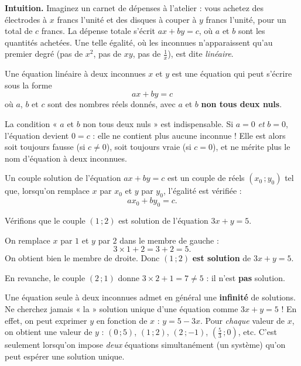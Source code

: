\documentclass[11pt]{article}
\newcommand{\cle}[1]{{\popxbold\color{popdark}#1}}
\newcounter{popsec}
\newcounter{popsub}
\newcommand{\courssub}[1]{%
  \stepcounter{popsub}%
  \par\vspace{9pt}\noindent{\popxbold\fontsize{11.5}{13}\selectfont\color{popink}{\color{poporange}\thepopsec.\thepopsub}\hspace{6pt}#1}\par\nopagebreak\vspace{4pt}
}
\begin{document}
\courssub{Équation linéaire à deux inconnues}

\textbf{Intuition.} Imaginez un carnet de dépenses à l'atelier : vous achetez des électrodes à $x$ francs l'unité et des disques à couper à $y$ francs l'unité, pour un total de $c$ francs. La dépense totale s'écrit $ax + by = c$, où $a$ et $b$ sont les quantités achetées. Une telle égalité, où les inconnues n'apparaissent qu'au premier degré (pas de $x^2$, pas de $xy$, pas de $\frac{1}{x}$), est dite \emph{linéaire}.

\begin{definition}
Une \cle{équation linéaire à deux inconnues} $x$ et $y$ est une équation qui peut s'écrire sous la forme
\[ ax + by = c \]
où $a$, $b$ et $c$ sont des nombres réels donnés, avec $a$ et $b$ \textbf{non tous deux nuls}.
\end{definition}

\begin{attention}
La condition « $a$ et $b$ non tous deux nuls » est indispensable. Si $a = 0$ \emph{et} $b = 0$, l'équation devient $0 = c$ : elle ne contient plus aucune inconnue ! Elle est alors soit toujours fausse (si $c \neq 0$), soit toujours vraie (si $c = 0$), et ne mérite plus le nom d'équation à deux inconnues.
\end{attention}

\begin{definition}
Un \cle{couple solution} de l'équation $ax + by = c$ est un couple de réels $(x_0 \,; y_0)$ tel que, lorsqu'on remplace $x$ par $x_0$ et $y$ par $y_0$, l'égalité est vérifiée :
\[ a x_0 + b y_0 = c. \]
\end{definition}

\begin{exemplebox}
Vérifions que le couple $(1 \,; 2)$ est solution de l'équation $3x + y = 5$.

On remplace $x$ par $1$ et $y$ par $2$ dans le membre de gauche :
\[ 3 \times 1 + 2 = 3 + 2 = 5. \]
On obtient bien le membre de droite. Donc $(1 \,; 2)$ \textbf{est solution} de $3x + y = 5$.

En revanche, le couple $(2 \,; 1)$ donne $3 \times 2 + 1 = 7 \neq 5$ : il n'est \textbf{pas} solution.
\end{exemplebox}

\begin{attention}
Une équation seule à deux inconnues admet en général une \textbf{infinité} de solutions. Ne cherchez jamais « la » solution unique d'une équation comme $3x + y = 5$ ! En effet, on peut exprimer $y$ en fonction de $x$ : $y = 5 - 3x$. Pour \emph{chaque} valeur de $x$, on obtient une valeur de $y$ : $(0 \,; 5)$, $(1 \,; 2)$, $(2 \,; -1)$, $\left(\frac{5}{3} \,; 0\right)$, etc. C'est seulement lorsqu'on impose \emph{deux} équations simultanément (un système) qu'on peut espérer une solution unique.
\end{attention}
\end{document}
